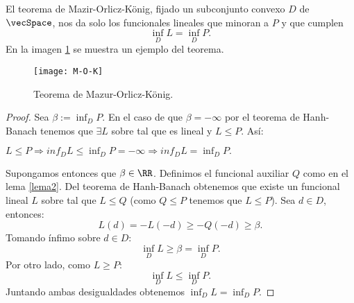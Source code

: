 El teorema de Mazir-Orlicz-König, fijado un subconjunto convexo $ D $ de $ \vecSpace $, nos da solo los funcionales lineales que minoran a $ P $ y que cumplen
\[
\inf_D L = \inf_D P.
\]
En la imagen \ref{M-O-K-fotos} se muestra un ejemplo del teorema.
\begin{figure}[h!]
	\centering
	\texttt{[image: M-O-K]}
	\caption{Teorema de Mazur-Orlicz-König.}
	\label{M-O-K-fotos}
\end{figure} 

	\begin{proof}
		Sea $ \beta := \inf_D P $. En el caso de que $ \beta = -\infty $ por el teorema de Hanh-Banach tenemos que $ \exists L $ sobre \vecSpace tal que es lineal y $ L \leq P$. Así:
		\begin{center}
			$ L \leq P \Longrightarrow inf_D L \leq \inf_D P = -\infty \Longrightarrow inf_D L = \inf_D P.$ 
		\end{center}
		Supongamos entonces que $ \beta \in \RR $. Definimos el funcional auxiliar $ Q $ como en el lema \ref{lema2}. Del teorema de Hanh-Banach obtenemos que existe un funcional lineal $ L $ sobre \vecSpace tal que $ L \leq Q$ (como $ Q \leq P $ tenemos que $ L \leq P $). Sea $ d \in D $, entonces:
		\[
		L(d) = -L(-d) \geq -Q(-d) \geq \beta.
		\]
		Tomando ínfimo sobre $ d \in D $:
		\[
		\inf_D L \geq \beta = \inf_D P.
		\]
		Por otro lado, como $ L \geq P $:
		\[
		\inf_D L \leq\inf_D P.
		\]
		Juntando ambas desigualdades obtenemos $ \inf_D L =\inf_D P $.
	\end{proof}

\bigskip
